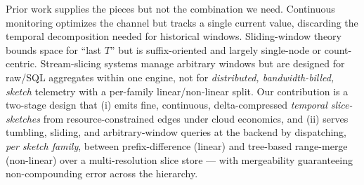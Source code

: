 Prior work supplies the pieces but not the combination we need.
Continuous monitoring optimizes the channel but tracks a single current
value, discarding the temporal decomposition needed for historical
windows. Sliding-window theory bounds space for ``last $T$'' but is
suffix-oriented and largely single-node or count-centric. Stream-slicing
systems manage arbitrary windows but are designed for raw/SQL aggregates
within one engine, not for \emph{distributed, bandwidth-billed, sketch}
telemetry with a per-family linear/non-linear split. Our contribution is a
two-stage design that (i) emits fine, continuous, delta-compressed
\emph{temporal slice-sketches} from resource-constrained edges under cloud
economics, and (ii) serves tumbling, sliding, and arbitrary-window queries
at the backend by dispatching, \emph{per sketch family}, between
prefix-difference (linear) and tree-based range-merge (non-linear) over a
multi-resolution slice store --- with mergeability guaranteeing
non-compounding error across the hierarchy.


